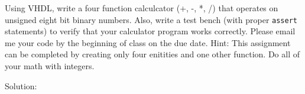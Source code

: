 Using VHDL, write a four function calculcator (+, -, *, /) that operates on unsigned eight bit binary numbers.  Also, write a test bench (with proper \texttt{assert} statements) to verify that your calculator program works correctly.  Please email me your code by the beginning of class on the due date.  Hint: This assignment can be completed by creating only four enitities and one other function.  Do all of your math with integers.

Solution: \\ \\


